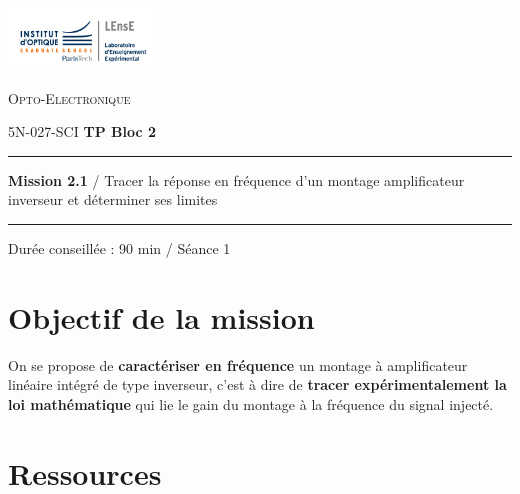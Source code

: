 \newpage
\pagestyle{empty}

\begin{minipage}[c]{.25\linewidth}
	\includegraphics[width=4cm]{images/Logo-LEnsE.png}
\end{minipage} \hfill
\begin{minipage}[c]{.4\linewidth}

\begin{center}
\vspace{0.3cm}
{\Large \textsc{Opto-Electronique}}

\medskip

5N-027-SCI \qquad \textbf{\Large TP Bloc 2}

\end{center}
\end{minipage}\hfill

\vspace{0.5cm}

\noindent \rule{\linewidth}{1pt}

{\noindent\Large \rule[-7pt]{0pt}{30pt}  \textbf{Mission 2.1} / Tracer la réponse en fréquence d'un montage amplificateur inverseur et déterminer ses limites} 

\noindent \rule{\linewidth}{1pt}

\vspace{-0.5cm}

\begin{center}

Durée conseillée : 90 min / Séance 1

\end{center}

\section{Objectif de la mission}
\label{mission21}

On se propose de \textbf{caractériser en fréquence} un montage à amplificateur linéaire intégré de type inverseur, c'est à dire de \textbf{tracer expérimentalement la loi mathématique} qui lie le gain du montage à la fréquence du signal injecté.

\section{Ressources}

